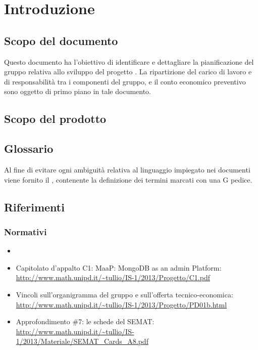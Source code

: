 \section{Introduzione}

	\subsection{Scopo del documento}

Questo documento ha l'obiettivo di identificare e dettagliare la pianificazione del gruppo \GroupName{} relativa allo sviluppo del progetto \ProjectName{}. La ripartizione del carico di lavoro e di responsabilità tra i componenti del gruppo, e il conto economico preventivo sono oggetto di primo piano in tale documento.

	\subsection{Scopo del prodotto}

\ScopoDelProdotto

	\subsection{Glossario}

Al fine di evitare ogni ambiguità relativa al linguaggio impiegato nei documenti viene fornito il \Glossario{} , contenente la definizione dei termini marcati con una G pedice.
	
	\subsection{Riferimenti}
	\label{Riferimenti}
	
		\subsubsection{Normativi}
		
		\begin{itemize}
		\item \NormeDiProgetto
		\item Capitolato d'appalto C1: MaaP: MongoDB as an admin Platform:\\
			\url{http://www.math.unipd.it/~tullio/IS-1/2013/Progetto/C1.pdf}
		\item Vincoli sull'organigramma del gruppo e sull'offerta tecnico-economica:\\
			\url{http://www.math.unipd.it/~tullio/IS-1/2013/Progetto/PD01b.html}
		\item Approfondimento \#7: le schede del SEMAT:\\
			\url{http://www.math.unipd.it/~tullio/IS-1/2013/Materiale/SEMAT_Cards_A8.pdf}
        \end{itemize}
        
